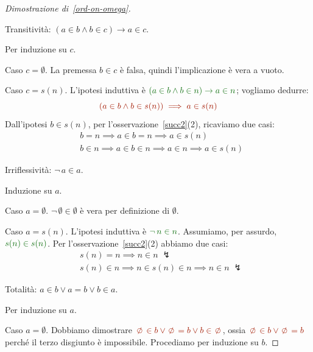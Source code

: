 \begin{proof}[Dimostrazione di~\ref{ord-on-omega}]
\ 

{\drkblu Transitivit\`a:} $(a \in b \land b \in c) \rightarrow a \in c$.

\setlength{\leftskip}{2em}

Per induzione su $c$.

{\drkred Caso $c = \emptyset$.} La premessa $b \in c$ \`e falsa, quindi
l'implicazione \`e vera a vuoto.

{\drkred Caso $c = s(n)$.} L'ipotesi induttiva \`e $\drkgrn (a \in b \land
b \in n) \rightarrow a \in n$; vogliamo dedurre:
				\[ \drkred (a \in b \land b \in s(n))
\implies a \in s(n)
					\]
Dall'ipotesi $b\in s(n)$, per l'osservazione~\ref{succ2}(2), ricaviamo due casi:
				\[ \begin{split}
					& b = n \implies a \in b = n \implies a \in s(n)\\
					& b \in n \implies a \in b \in n
\implies a \in n \implies a\in s(n)
				\end{split}
					\]

\setlength{\leftskip}{0pt}

{\drkblu Irriflessivit\`a:} $\neg \,a \in a$.

\setlength{\leftskip}{2em}

Induzione su $a$.

{\drkred Caso $a = \emptyset$.} $\neg \, \emptyset \in \emptyset$ \`e vera per definizione di $\emptyset$.

{\drkred Caso $a = s(n)$.} L'ipotesi induttiva \`e $\drkgrn \neg \, n \in n$.
Assumiamo, per assurdo, $\drkgrn s(n) \in s(n)$. Per
l'osservazione~\ref{succ2}(2) abbiamo due casi:
			\[ \begin{split}
				& s(n) = n \implies n \in n \; \lightning\\
				& s(n) \in n \implies n \in s(n) \in n \implies n \in n \; \lightning
			\end{split}
				\]

\setlength{\leftskip}{0pt}

{\drkblu Totalit\`a:} $a \in b \lor a = b \lor b \in a$.

\setlength{\leftskip}{2em}

Per induzione su $a$.

{\drkred Caso $a = \emptyset$.} Dobbiamo dimostrare $\drkred \emptyset \in b \lor
\emptyset = b \lor b \in \emptyset$, ossia $\drkred \emptyset \in b \lor
\emptyset = b$ perch\'e il terzo disgiunto \`e impossibile.
Procediamo per induzione su $b$.


\end{proof}
